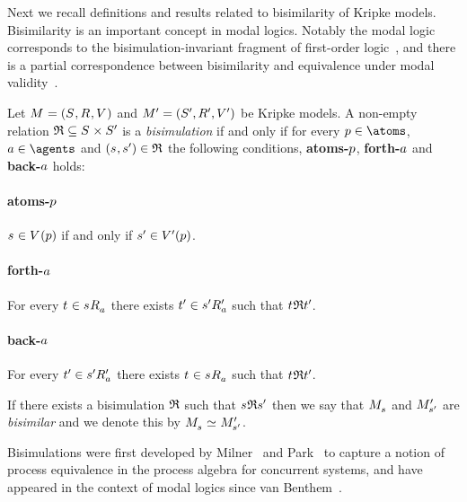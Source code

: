 Next we recall definitions and results related to bisimilarity of Kripke models.
Bisimilarity is an important concept in modal logics.
Notably the modal logic \logicK{} corresponds to the bisimulation-invariant fragment of first-order logic~\cite{vanbenthem:1984}, and there is a partial correspondence between bisimilarity and equivalence under modal validity~\cite{goranko:2006}.

\begin{definition}[Bisimulation]
Let $\kModelAndTuple$ and $\kModelAndTupleP$ be Kripke models.
A non-empty relation $\bisimulation \subseteq \kStates \times \kStatesP$ is a {\em bisimulation} if and only if for every $\atomP \in \atoms$, $\agentA \in \agents$ and $(\kStateS, \kStateSP) \in \bisimulation$ the following conditions, {\bf atoms-$p$}, {\bf forth-$a$} and {\bf back-$a$} holds:

\paragraph{atoms-$p$}
$\kStateS \in \kValuation(\atomP)$ if and only if ${{s}^{\prime}} \in {V^{\prime}}(p)$.

\paragraph{forth-$a$}
For every $\kStateT \in \kSuccessorsA{\kStateS}$ there exists ${{t}^{\prime}} \in {{{s}^{\prime}}} {R^{\prime}_{a}}$ such that $\kStateT \bisimulation \kStateTP$.

\paragraph{back-$a$}
For every ${{t}^{\prime}} \in {{{s}^{\prime}}} {R^{\prime}_{a}}$ there exists $\kStateT \in \kSuccessorsA{\kStateS}$ such that $\kStateT \bisimulation \kStateTP$.

If there exists a bisimulation $\mathfrak{R}$ such that $\kStateS \bisimulation \kStateSP$ then we say that $\kPModel{\kStateS}$ and ${M^{\prime}_{{{s}^{\prime}}}}$ are {\em bisimilar} and we denote this by $\kPModel{\kStateS} \bisimilar \kPModelP{\kStateSP}$.
\end{definition}

Bisimulations were first developed by Milner~\cite{milner:1980} and Park~\cite{park:1981} to capture a notion of process equivalence in the process algebra for concurrent systems, and have appeared in the context of modal logics since van Benthem~\cite{vanbenthem:1984}.

